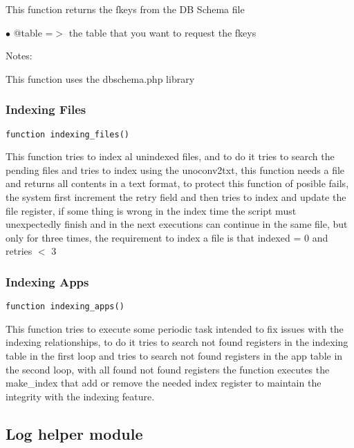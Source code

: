 \documentclass[a4paper]{article}
\begin{document}
This function returns the fkeys from the DB Schema file

\begin{compactitem}
\item[\color{myblue}$\bullet$] @table =$>$ the table that you want to request the fkeys
\end{compactitem}

Notes:

This function uses the dbschema.php library

\hypertarget{toc486}{}
\subsubsection{Indexing Files}

\begin{lstlisting}
function indexing_files()
\end{lstlisting}

This function tries to index al unindexed files, and to do it tries to search
the pending files and tries to index using the unoconv2txt, this function needs
a file and returns all contents in a text format, to protect this function of
posible fails, the system first increment the retry field and then tries to
index and update the file register, if some thing is wrong in the index time
the script must unexpectedly finish and in the next executions can continue
in the same file, but only for three times, the requirement to index a file
is that indexed = 0 and retries $<$ 3

\hypertarget{toc487}{}
\subsubsection{Indexing Apps}

\begin{lstlisting}
function indexing_apps()
\end{lstlisting}

This function tries to execute some periodic task intended to fix issues with
the indexing relationships, to do it tries to search not found registers in
the indexing table in the first loop and tries to search not found registers
in the app table in the second loop, with all found not found registers the
function executes the make\_index that add or remove the needed index register
to maintain the integrity with the indexing feature.

\hypertarget{toc488}{}
\subsection{Log helper module}
\end{document}
